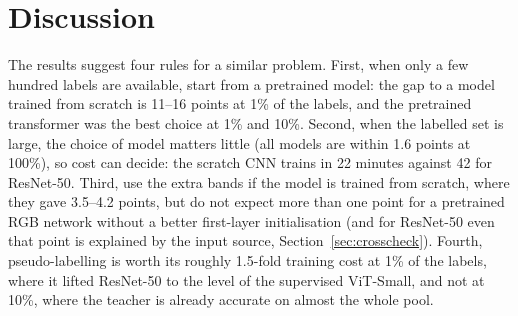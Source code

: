 \documentclass[twoside,a4paper,11pt]{article}
\newcommand{\tabdir}{../results/tables}
\begin{document}


\section{Discussion}\label{sec:discussion}
The results suggest four rules for a similar problem. First, when only a few hundred labels are available, start from a pretrained model: the gap to a model trained from scratch is 11--16 points at 1\% of the labels, and the pretrained transformer was the best choice at 1\% and 10\%. Second, when the labelled set is large, the choice of model matters little (all models are within 1.6 points at 100\%), so cost can decide: the scratch CNN trains in 22 minutes against 42 for ResNet-50. Third, use the extra bands if the model is trained from scratch, where they gave 3.5--4.2 points, but do not expect more than one point for a pretrained RGB network without a better first-layer initialisation (and for ResNet-50 even that point is explained by the input source, Section~\ref{sec:crosscheck}). Fourth, pseudo-labelling is worth its roughly 1.5-fold training cost at 1\% of the labels, where it lifted ResNet-50 to the level of the supervised ViT-Small, and not at 10\%, where the teacher is already accurate on almost the whole pool.
\end{document}
